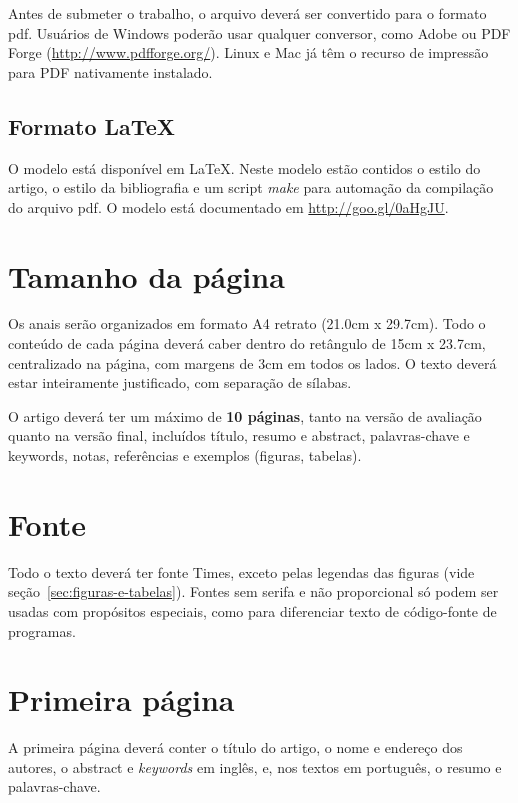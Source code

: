 \documentclass[12pt]{article}
\begin{document}
Antes de submeter o trabalho, o arquivo deverá ser convertido para o
formato pdf. Usuários de Windows poderão usar qualquer conversor, como
Adobe ou PDF Forge (\url{http://www.pdfforge.org/}). Linux e Mac já
têm o recurso de impressão para PDF nativamente instalado.

\subsection{Formato \LaTeX}
\label{sec:latex}

O modelo está disponível em \LaTeX{}. Neste modelo estão contidos o
estilo do artigo, o estilo da bibliografia e um script \textit{make}
para automação da compilação do arquivo pdf. O modelo está documentado
em \url{http://goo.gl/0aHgJU}.

\section{Tamanho da página}
\label{sec:tamanho-pagina}

Os anais serão organizados em formato A4 retrato (21.0cm x 29.7cm).
Todo o conteúdo de cada página deverá caber dentro do retângulo de
15cm x 23.7cm, centralizado na página, com margens de 3cm em todos os
lados. O texto deverá estar inteiramente justificado, com separação de
sílabas.

O artigo deverá ter um máximo de \textbf{10 páginas}, tanto na versão
de avaliação quanto na versão final, incluídos título, resumo e
abstract, palavras-chave e keywords, notas, referências e exemplos
(figuras, tabelas).

\section{Fonte}
\label{sec:fonte}

Todo o texto deverá ter fonte Times, exceto pelas legendas das figuras
(vide seção~\ref{sec:figuras-e-tabelas}). Fontes sem serifa e não
proporcional só podem ser usadas com propósitos especiais, como para
diferenciar texto de código-fonte de programas.

\section{Primeira página}

A primeira página deverá conter o título do artigo, o nome e endereço
dos autores, o abstract e \textit{keywords} em inglês, e, nos textos
em português, o resumo e palavras-chave.
\end{document}
